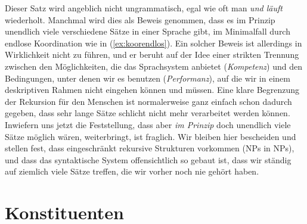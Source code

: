 \begin{exe}
\end{exe}

Dieser Satz wird angeblich nicht ungrammatisch, egal wie oft man \textit{und läuft} wiederholt.
Manchmal wird dies als Beweis genommen, dass es im Prinzip unendlich viele verschiedene Sätze in einer Sprache gibt, im Minimalfall durch endlose Koordination wie in (\ref{ex:koorendlos}).
Ein solcher Beweis ist allerdings in Wirklichkeit nicht zu führen, und er beruht auf der Idee einer strikten Trennung zwischen den Möglichkeiten, die das Sprachsystem anbietet (\textit{Kompetenz}) und den Bedingungen, unter denen wir es benutzen (\textit{Performanz}), auf die wir in einem deskriptiven Rahmen nicht eingehen können und müssen.
Eine klare Begrenzung der Rekursion für den Menschen ist normalerweise ganz einfach schon dadurch gegeben, dass sehr lange Sätze schlicht nicht mehr verarbeitet werden können.
Inwiefern uns jetzt die Feststellung, dass aber \textit{im Prinzip} doch unendlich viele Sätze möglich wären, weiterbringt, ist fraglich.
Wir bleiben hier bescheiden und stellen fest, dass eingeschränkt rekursive Strukturen vorkommen (\zB NPs in NPs), und dass das syntaktische System offensichtlich so gebaut ist, dass wir ständig auf ziemlich viele Sätze treffen, die wir vorher noch nie gehört haben.



\section{Konstituenten}

\label{sec:satzglieder}


